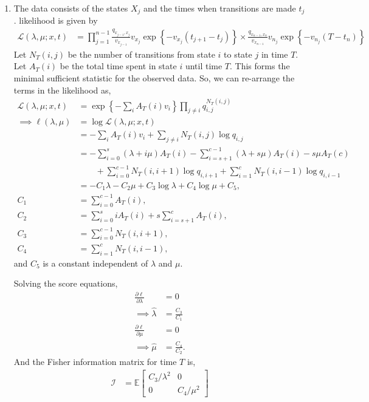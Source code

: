 \documentclass[11pt]{article}
\newcommand{\E}{\mathbb{E}}
\begin{document}
\begin{enumerate}
\item The data consists of the states $X_j$ and the times when transitions are made $t_j$. likelihood is given by
\begin{align*}
	\mathcal{L}(\lambda, \mu; x, t) &= \prod_{j=1}^{n-1} \frac{q_{x_{j-1}, x_j}}{v_{x_{j-1}}} v_{x_j} \exp \left\{ -v_{x_j} (t_{j+1} - t_j) \right\} \times \frac{q_{x_{n-1}, x_n}}{v_{x_{n-1}}} v_{n_j} \exp \left\{ -v_{n_j} (T - t_n) \right\}
\end{align*}
Let $N_T(i, j)$ be the number of transitions from state $i$ to state $j$ in time $T$. Let $A_T(i)$ be the total time spent in state $i$ until time $T$. This forms the minimal sufficient statistic for the observed data. So, we can re-arrange the terms in the likelihood as,
\begin{align*}
	\mathcal{L}(\lambda, \mu; x, t) &= \exp \left\{ -\sum_i A_T(i) v_i \right\} \prod_{j \neq i} q_{i, j}^{N_T(i, j)} \\
	\implies \ell(\lambda, \mu) &= \log \mathcal{L} (\lambda, \mu; x, t) \\
	&= -\sum_i A_T(i) v_i + \sum_{j \neq i} N_T(i, j) \log q_{i, j} \\
	&= -\sum_{i=0}^s (\lambda + i \mu) A_T(i) - \sum_{i=s+1}^{c-1} (\lambda + s \mu) A_T(i) - s \mu A_T(c) \\
	&\qquad + \sum_{i=0}^{c-1} N_T(i, i+1) \log q_{i, i+1} + \sum_{i=1}^c N_T(i, i-1) \log q_{i, i-1} \\
	&= -C_1 \lambda - C_2 \mu + C_3 \log \lambda + C_4 \log \mu + C_5, \\
	C_1 &= \sum_{i=0}^{c-1} A_T(i), \\
	C_2 &= \sum_{i=0}^s i A_T(i) + s \sum_{i=s+1}^c A_T(i), \\
	C_3 &= \sum_{i=0}^{c-1} N_T(i, i+1), \\
	C_4 &= \sum_{i=1}^c N_T(i, i-1),
\end{align*}
and $C_5$ is a constant independent of $\lambda$ and $\mu$.

Solving the score equations,
\begin{align*}
	\frac{\partial \ell}{ \partial \lambda} &= 0 \\
	\implies \widehat{\lambda} &= \frac{C_3}{C_1} \\
	\frac{\partial \ell}{ \partial \mu} &= 0 \\
	\implies \widehat{\mu} &= \frac{C_4}{C_2}.
\end{align*}
And the Fisher information matrix for time $T$ is,
\begin{align*}
	\mathcal{I} &= \E \begin{bmatrix}
	C_3 / \lambda^2 & 0 \\
	0 & C_4 / \mu^2
	\end{bmatrix}
\end{align*}


\end{enumerate}
\end{document}
